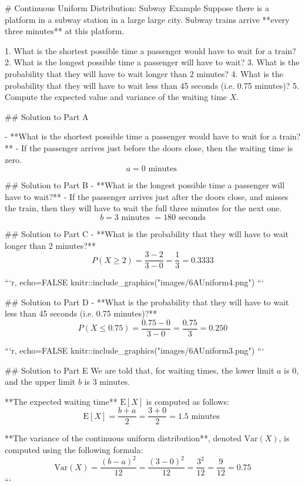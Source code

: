 # Continuous Uniform Distribution: Subway Example
Suppose there is a platform in a subway station in a large large city.  
Subway trains arrive **every three minutes** at this platform.

1. What is the shortest possible time a passenger would have to wait for a train?
2. What is the longest possible time a passenger will have to wait?
3. What is the probability that they will have to wait longer than 2 minutes?
4. What is the probability that they will have to wait less than 45 seconds (i.e. 0.75 minutes)?
5. Compute the expected value and variance of the waiting time $X$.

## Solution to Part A

- **What is the shortest possible time a passenger would have to wait for a train?**
    - If the passenger arrives just before the doors close, then the waiting time is zero.
    \[ a = 0 \text{ minutes } \]

## Solution to Part B
- **What is the longest possible time a passenger will have to wait?**
    - If the passenger arrives just after the doors close, and misses the train, then they will have to wait the full three minutes for the next one.
    \[ b = 3 \text{ minutes }  = 180 \text{ seconds}  \]

## Solution to Part C
- **What is the probability that they will have to wait longer than 2 minutes?**
    \[ P(X \geq 2)  = \frac{3-2}{3-0} = \frac{1}{3} = 0.3333 \]

```{r, echo=FALSE}
knitr::include_graphics("images/6AUniform4.png")
```

## Solution to Part D
- **What is the probability that they will have to wait less than 45 seconds (i.e. 0.75 minutes)?**
    \[ P(X \leq 0.75)  = \frac{0.75 - 0}{3-0} = \frac{0.75}{3} = 0.250 \]

```{r, echo=FALSE}
knitr::include_graphics("images/6AUniform3.png")
```

## Solution to Part E
We are told that, for waiting times, the lower limit $a$ is 0, and the upper limit $b$ is 3 minutes. 

**The expected waiting time** $\textrm{E}[X]$ is computed as follows:
    \[
    \textrm{E}[X] = \frac{b + a}{2} = \frac{3 + 0}{2} = 1.5 \text{ minutes }
    \]

**The variance of the continuous uniform distribution**, denoted $\textrm{Var}(X)$, is computed using the following formula:
    \[
    \textrm{Var}(X) = \frac{(b - a)^2}{12} = \frac{(3 - 0)^2}{12} = \frac{3^2}{12} = \frac{9}{12} = 0.75
    \]
```

